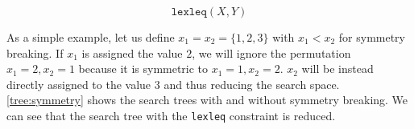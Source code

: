 \documentclass[../../thesis.tex]{subfiles}
\begin{document}
\begin{equation}
  \texttt{lexleq}(X, Y)
\end{equation}

As a simple example, let us define $x_1 = x_2 = \{ 1, 2, 3 \}$ with $x_1 < x_2$ for symmetry breaking. If 
$x_1$ is assigned the value $2$, we will ignore the permutation $x_1 = 2, x_2 = 1$ because it is symmetric to $x_1 = 1, x_2 = 2$. $x_2$ will be instead directly assigned to the value $3$ and thus reducing the search space.
\autoref{tree:symmetry} shows the search trees with and without symmetry breaking. We can see that the search tree with the \texttt{lexleq} constraint is reduced.

\end{document}
